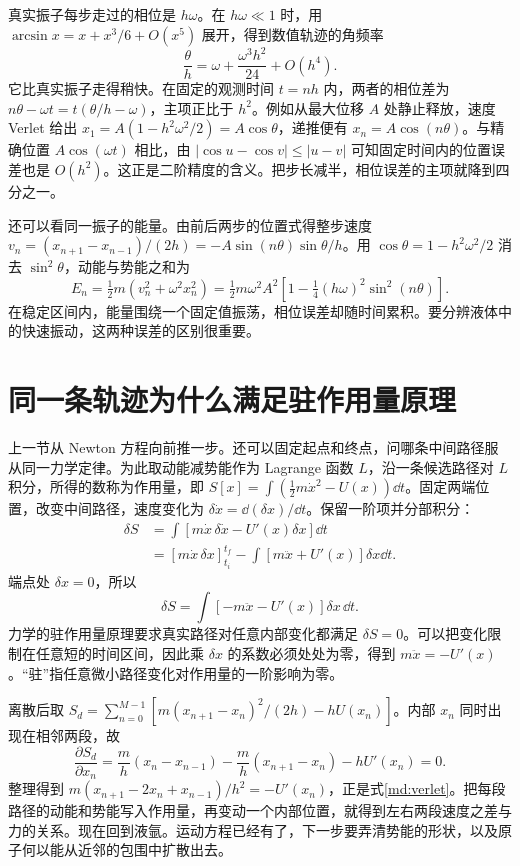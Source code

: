 真实振子每步走过的相位是 $h\omega$。在 $h\omega\ll1$ 时，用 $\arcsin x=x+x^3/6+O(x^5)$ 展开，得到数值轨迹的角频率
\[
 \frac{\theta}{h}=\omega+\frac{\omega^3h^2}{24}+O(h^4).
\]
它比真实振子走得稍快。在固定的观测时间 $t=nh$ 内，两者的相位差为 $n\theta-\omega t=t(\theta/h-\omega)$，主项正比于 $h^2$。例如从最大位移 $A$ 处静止释放，速度 Verlet 给出 $x_1=A(1-h^2\omega^2/2)=A\cos\theta$，递推便有 $x_n=A\cos(n\theta)$。与精确位置 $A\cos(\omega t)$ 相比，由 $|\cos u-\cos v|\le |u-v|$ 可知固定时间内的位置误差也是 $O(h^2)$。这正是二阶精度的含义。把步长减半，相位误差的主项就降到四分之一。

还可以看同一振子的能量。由前后两步的位置式得整步速度 $v_n=(x_{n+1}-x_{n-1})/(2h)=-A\sin(n\theta)\sin\theta/h$。用 $\cos\theta=1-h^2\omega^2/2$ 消去 $\sin^2\theta$，动能与势能之和为
\[
 E_n=\tfrac12 m(v_n^2+\omega^2x_n^2)
 =\tfrac12 m\omega^2 A^2\left[1-\tfrac14(h\omega)^2\sin^2(n\theta)\right].
\]
在稳定区间内，能量围绕一个固定值振荡，相位误差却随时间累积。要分辨液体中的快速振动，这两种误差的区别很重要。

\section{同一条轨迹为什么满足驻作用量原理}
上一节从 Newton 方程向前推一步。还可以固定起点和终点，问哪条中间路径服从同一力学定律。为此取动能减势能作为 Lagrange 函数 $L$，沿一条候选路径对 $L$ 积分，所得的数称为作用量，即 $S[x]=\int(\tfrac12m\dot x^2-U(x))\dd t$。固定两端位置，改变中间路径，速度变化为 $\delta\dot x=\dd(\delta x)/\dd t$。保留一阶项并分部积分：
\begin{align}
\delta S&=\int[m\dot x\,\delta\dot x-U'(x)\delta x]\dd t\\
&=[m\dot x\,\delta x]_{t_i}^{t_f}
-\int[m\ddot x+U'(x)]\delta x\dd t.
\end{align}
端点处 $\delta x=0$，所以
\begin{equation}
\delta S=\int[-m\ddot x-U'(x)]\delta x\,\dd t.
\end{equation}
力学的驻作用量原理要求真实路径对任意内部变化都满足 $\delta S=0$。可以把变化限制在任意短的时间区间，因此乘 $\delta x$ 的系数必须处处为零，得到 $m\ddot x=-U'(x)$。“驻”指任意微小路径变化对作用量的一阶影响为零。

离散后取 $S_d=\sum_{n=0}^{M-1}[m(x_{n+1}-x_n)^2/(2h)-hU(x_n)]$。内部 $x_n$ 同时出现在相邻两段，故
\begin{equation}
\frac{\partial S_d}{\partial x_n}=\frac m h(x_n-x_{n-1})-\frac m h(x_{n+1}-x_n)-hU'(x_n)=0.
\end{equation}
整理得到 $m(x_{n+1}-2x_n+x_{n-1})/h^2=-U'(x_n)$，正是式\eqref{md:verlet}。把每段路径的动能和势能写入作用量，再变动一个内部位置，就得到左右两段速度之差与力的关系。现在回到液氩。运动方程已经有了，下一步要弄清势能的形状，以及原子何以能从近邻的包围中扩散出去。
